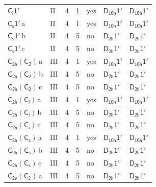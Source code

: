 \documentclass[10pt,a4paper]{article}
\numberwithin{equation}{section}
\newcommand{\grp}[1]{\mathsf{#1}}
\newcommand{\clsletter}[1]{\,{\scriptsize\color{black!55}#1}}
\begin{document}
{\begin{longtable}{@{}llrrlll@{}}
\href{S2-1p.pdf}{$\grp{C_{i}1'}$} & II & 4 & 1 & yes & \href{D10h-1p.pdf}{$\grp{D_{10h}1'}$} & \href{D10h-1p.pdf}{$\grp{D_{10h}1'}$}\\
\href{C1v-1p.pdf}{$\grp{C_{s}1'}$}\clsletter{a} & II & 4 & 1 & yes & \href{D10h-1p.pdf}{$\grp{D_{10h}1'}$} & \href{D10h-1p.pdf}{$\grp{D_{10h}1'}$}\\
\href{C1v-1p.pdf}{$\grp{C_{s}1'}$}\clsletter{b} & II & 4 & 5 & no & \href{D2h-1p.pdf}{$\grp{D_{2h}1'}$} & \href{D2h-1p.pdf}{$\grp{D_{2h}1'}$}\\
\href{C1v-1p.pdf}{$\grp{C_{s}1'}$}\clsletter{c} & II & 4 & 5 & no & \href{D2h-1p.pdf}{$\grp{D_{2h}1'}$} & \href{D2h-1p.pdf}{$\grp{D_{2h}1'}$}\\
\href{C2h-C2.pdf}{$\grp{C_{2h}}(\grp{C_{2}})$}\clsletter{a} & III & 4 & 1 & yes & \href{D10h-1p.pdf}{$\grp{D_{10h}1'}$} & \href{D10h-1p.pdf}{$\grp{D_{10h}1'}$}\\
\href{C2h-C2.pdf}{$\grp{C_{2h}}(\grp{C_{2}})$}\clsletter{b} & III & 4 & 5 & no & \href{D2h-1p.pdf}{$\grp{D_{2h}1'}$} & \href{D2h-1p.pdf}{$\grp{D_{2h}1'}$}\\
\href{C2h-C2.pdf}{$\grp{C_{2h}}(\grp{C_{2}})$}\clsletter{c} & III & 4 & 5 & no & \href{D2h-1p.pdf}{$\grp{D_{2h}1'}$} & \href{D2h-1p.pdf}{$\grp{D_{2h}1'}$}\\
\href{C2h-S2.pdf}{$\grp{C_{2h}}(\grp{C_{i}})$}\clsletter{a} & III & 4 & 1 & yes & \href{D10h-1p.pdf}{$\grp{D_{10h}1'}$} & \href{D10h-1p.pdf}{$\grp{D_{10h}1'}$}\\
\href{C2h-S2.pdf}{$\grp{C_{2h}}(\grp{C_{i}})$}\clsletter{b} & III & 4 & 5 & no & \href{D2h-1p.pdf}{$\grp{D_{2h}1'}$} & \href{D2h-1p.pdf}{$\grp{D_{2h}1'}$}\\
\href{C2h-S2.pdf}{$\grp{C_{2h}}(\grp{C_{i}})$}\clsletter{c} & III & 4 & 5 & no & \href{D2h-1p.pdf}{$\grp{D_{2h}1'}$} & \href{D2h-1p.pdf}{$\grp{D_{2h}1'}$}\\
\href{C2h-C1v.pdf}{$\grp{C_{2h}}(\grp{C_{s}})$}\clsletter{a} & III & 4 & 1 & yes & \href{D10h-1p.pdf}{$\grp{D_{10h}1'}$} & \href{D10h-1p.pdf}{$\grp{D_{10h}1'}$}\\
\href{C2h-C1v.pdf}{$\grp{C_{2h}}(\grp{C_{s}})$}\clsletter{b} & III & 4 & 5 & no & \href{D2h-1p.pdf}{$\grp{D_{2h}1'}$} & \href{D2h-1p.pdf}{$\grp{D_{2h}1'}$}\\
\href{C2h-C1v.pdf}{$\grp{C_{2h}}(\grp{C_{s}})$}\clsletter{c} & III & 4 & 5 & no & \href{D2h-1p.pdf}{$\grp{D_{2h}1'}$} & \href{D2h-1p.pdf}{$\grp{D_{2h}1'}$}\\
\href{C2v-C2.pdf}{$\grp{C_{2v}}(\grp{C_{2}})$}\clsletter{a} & III & 4 & 5 & no & \href{D2h-1p.pdf}{$\grp{D_{2h}1'}$} & \href{D2h-1p.pdf}{$\grp{D_{2h}1'}$}\\

\end{longtable}}
\end{document}

